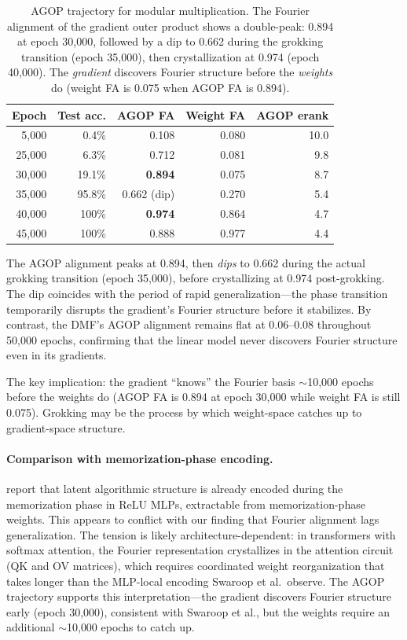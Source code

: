 \documentclass{article}
\begin{document}
\begin{table}[t]
\centering
\small
\begin{tabular}{rrrrr}
\toprule
Epoch & Test acc. & AGOP FA & Weight FA & AGOP erank \\
\midrule
5{,}000   & 0.4\%   & 0.108 & 0.080 & 10.0 \\
25{,}000  & 6.3\%   & 0.712 & 0.081 & 9.8 \\
30{,}000  & 19.1\%  & \textbf{0.894} & 0.075 & 8.7 \\
35{,}000  & 95.8\%  & 0.662 (dip) & 0.270 & 5.4 \\
40{,}000  & 100\%   & \textbf{0.974} & 0.864 & 4.7 \\
45{,}000  & 100\%   & 0.888 & 0.977 & 4.4 \\
\bottomrule
\end{tabular}
\caption{AGOP trajectory for modular multiplication. The Fourier alignment of
the gradient outer product shows a double-peak: 0.894 at epoch 30{,}000,
followed by a dip to 0.662 during the grokking transition (epoch 35{,}000),
then crystallization at 0.974 (epoch 40{,}000). The \emph{gradient}
discovers Fourier structure before the \emph{weights} do (weight FA is
0.075 when AGOP FA is 0.894).}
\label{tab:agop}
\end{table}

The AGOP alignment peaks at 0.894, then \emph{dips} to 0.662 during the
actual grokking transition (epoch 35{,}000), before crystallizing at 0.974
post-grokking. The dip coincides with the period of rapid generalization---the
phase transition temporarily disrupts the gradient's Fourier structure before
it stabilizes. By contrast, the DMF's AGOP alignment remains flat at
0.06--0.08 throughout 50{,}000 epochs, confirming that the linear model never
discovers Fourier structure even in its gradients.

The key implication: the gradient ``knows'' the Fourier basis $\sim$10{,}000
epochs before the weights do (AGOP FA is 0.894 at epoch 30{,}000 while weight
FA is still 0.075). Grokking may be the process by which weight-space catches
up to gradient-space structure.

\paragraph{Comparison with memorization-phase encoding.}
\citet{swaroop2026latent} report that latent algorithmic structure is already
encoded during the memorization phase in ReLU MLPs, extractable from
memorization-phase weights. This appears to conflict with our finding that
Fourier alignment lags generalization. The tension is likely
architecture-dependent: in transformers with softmax attention, the Fourier
representation crystallizes in the attention circuit (QK and OV matrices),
which requires coordinated weight reorganization that takes longer than the
MLP-local encoding Swaroop et al.\ observe. The AGOP trajectory supports
this interpretation---the gradient discovers Fourier structure early (epoch
30{,}000), consistent with Swaroop et al., but the weights require an
additional $\sim$10{,}000 epochs to catch up.
\end{document}
